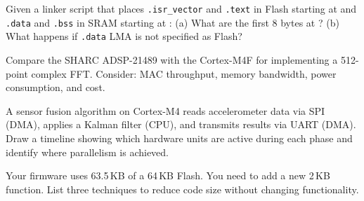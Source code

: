 \begin{exercise}
Given a linker script that places \texttt{.isr\_vector} and \texttt{.text} in Flash starting at  and \texttt{.data} and \texttt{.bss} in SRAM starting at : (a) What are the first 8 bytes at ? (b) What happens if \texttt{.data} LMA is not specified as Flash?
\end{exercise}

\begin{exercise}
Compare the SHARC ADSP-21489 with the Cortex-M4F for implementing a 512-point complex FFT. Consider: MAC throughput, memory bandwidth, power consumption, and cost.
\end{exercise}

\begin{exercise}
A sensor fusion algorithm on Cortex-M4 reads accelerometer data via SPI (DMA), applies a Kalman filter (CPU), and transmits results via UART (DMA). Draw a timeline showing which hardware units are active during each phase and identify where parallelism is achieved.
\end{exercise}

\begin{exercise}
Your firmware uses 63.5\,KB of a 64\,KB Flash. You need to add a new 2\,KB function. List three techniques to reduce code size without changing functionality.
\end{exercise}
